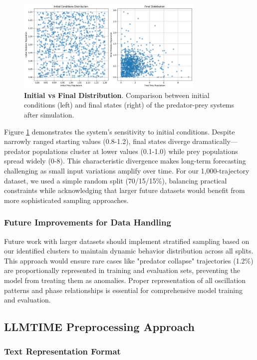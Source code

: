 \documentclass{article}
\begin{document}
\begin{figure} [H]
    \centering
    \includegraphics[width=0.8\textwidth]{initial_final_distribution}
    \caption{\textbf{Initial vs Final Distribution}. Comparison between initial conditions (left) and final states (right) of the predator-prey systems after simulation.}
    \label{fig:initial}
\end{figure}

Figure \ref{fig:initial} demonstrates the system's sensitivity to initial conditions. Despite narrowly ranged starting values (0.8-1.2), final states diverge dramatically—predator populations cluster at lower values (0.1-1.0) while prey populations spread widely (0-8). This characteristic divergence makes long-term forecasting challenging as small input variations amplify over time. For our 1,000-trajectory dataset, we used a simple random split (70/15/15\%), balancing practical constraints while acknowledging that larger future datasets would benefit from more sophisticated sampling approaches.
\subsubsection*{Future Improvements for Data Handling}
Future work with larger datasets should implement stratified sampling based on our identified clusters to maintain dynamic behavior distribution across all splits. This approach would ensure rare cases like "predator collapse" trajectories (1.2\%) are proportionally represented in training and evaluation sets, preventing the model from treating them as anomalies. Proper representation of all oscillation patterns and phase relationships is essential for comprehensive model training and evaluation.
\subsection*{LLMTIME Preprocessing Approach}

\subsubsection*{Text Representation Format}
\end{document}
